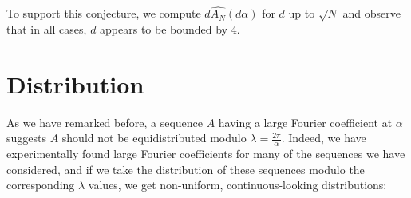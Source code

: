\documentclass{article}
\theoremstyle{definition}
\theoremstyle{remark}
\numberwithin{equation}{section}
\begin{document}





To support this conjecture, we compute $d \widehat{A_N}(d\alpha)$ for
$d$ up to $\sqrt{N}$ and observe that in all cases, $d$ appears to be
bounded by 4.  

\section{Distribution}

As we have remarked before, a sequence $A$ having a large Fourier
coefficient at $\alpha$ suggests $A$ should not be equidistributed
modulo $\lambda = \frac{2\pi}{\alpha}$.  Indeed, we have
experimentally found large Fourier coefficients for many of the
sequences we have considered, and if we take the distribution of these
sequences modulo the corresponding $\lambda$ values, we get
non-uniform, continuous-looking distributions:
\end{document}
